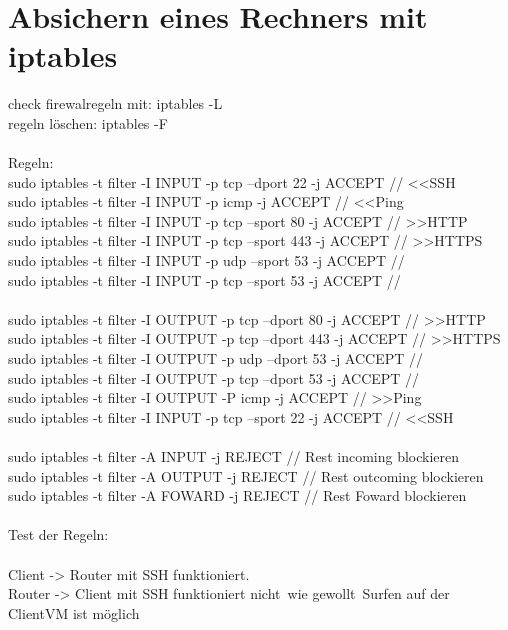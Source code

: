 \documentclass[12pt]{article}
\theoremstyle{plain}
\begin{document}
\section{Absichern eines Rechners mit iptables}
check firewalregeln mit: iptables -L\\
regeln löschen: iptables -F\\\\
Regeln:\\
sudo iptables -t filter -I INPUT -p tcp --dport 22 -j ACCEPT // <<SSH \\
sudo iptables -t filter -I INPUT -p icmp -j ACCEPT // <<Ping \\
sudo iptables -t filter -I INPUT -p tcp --sport 80 -j ACCEPT // >>HTTP \\
sudo iptables -t filter -I INPUT -p tcp --sport 443 -j ACCEPT // >>HTTPS\\
sudo iptables -t filter -I INPUT -p udp --sport 53 -j ACCEPT //\\
sudo iptables -t filter -I INPUT -p tcp --sport 53 -j ACCEPT //\\
\\
sudo iptables -t filter -I OUTPUT -p tcp --dport 80 -j ACCEPT // >>HTTP \\
sudo iptables -t filter -I OUTPUT -p tcp --dport 443 -j ACCEPT // >>HTTPS\\
sudo iptables -t filter -I OUTPUT -p udp --dport 53 -j ACCEPT //\\
sudo iptables -t filter -I OUTPUT -p tcp --dport 53 -j ACCEPT //\\
sudo iptables -t filter -I OUTPUT -P icmp -j ACCEPT // >>Ping \\
sudo iptables -t filter -I INPUT -p tcp --sport 22 -j ACCEPT // <<SSH \\
\\
sudo iptables -t filter -A INPUT -j REJECT // Rest incoming blockieren \\
sudo iptables -t filter -A OUTPUT -j REJECT // Rest outcoming blockieren \\
sudo iptables -t filter -A FOWARD -j REJECT // Rest Foward blockieren \\
\\
Test der Regeln: \\\\
Client -> Router mit SSH funktioniert.\\
Router -> Client mit SSH funktioniert nicht\, wie gewollt\
Surfen auf der ClientVM ist möglich\\
\\
\end{document}
